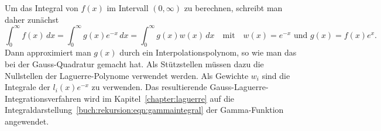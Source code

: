 Um das Integral von $f(x)$ im Intervall $(0,\infty)$ zu berechnen,
schreibt man daher zunächst
\[
\int_0^\infty f(x)\,dx
=
\int_0^\infty g(x)e^{-x}\,dx
=
\int_0^\infty g(x) w(x)\,dx
\quad\text{mit}\quad
w(x)=e^{-x}
\text{ und }
g(x)=f(x)e^x.
\]
Dann approximiert man $g(x)$ durch ein Interpolationspolynom,
so wie man das bei der Gauss-Quadratur gemacht hat.
Als Stützstellen müssen dazu die Nullstellen der Laguerre-Polynome
verwendet werden.
Als Gewichte $w_i$ sind die Integrale der $l_i(x)e^{-x}$
zu verwenden.
Das resultierende Gauss-Laguerre-Integrationsverfahren wird im 
Kapitel~\ref{chapter:laguerre} auf die
Integraldarstellung~\eqref{buch:rekursion:eqn:gammaintegral}
der Gamma-Funktion angewendet.




